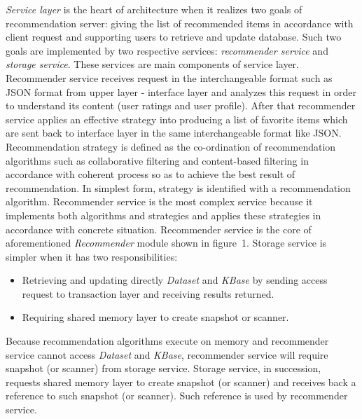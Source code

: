 \documentclass[a4paper]{llncs}
\begin{document}
\textit{Service layer} is the heart of architecture when it realizes two goals of recommendation server: giving the list of recommended items in accordance with client request and supporting users to retrieve and update database. Such two goals are implemented by two respective services: \textit{recommender service} and \textit{storage service}. These services are main components of service layer. Recommender service receives request in the interchangeable format such as JSON format from upper layer - interface layer and analyzes this request in order to understand its content (user ratings and user profile). After that recommender service applies an effective strategy into producing a list of favorite items which are sent back to interface layer in the same interchangeable format like JSON. Recommendation strategy is defined as the co-ordination of recommendation algorithms such as collaborative filtering and content-based filtering in accordance with coherent process so as to achieve the best result of recommendation. In simplest form, strategy is identified with a recommendation algorithm. Recommender service is the most complex service because it implements both algorithms and strategies and applies these strategies in accordance with concrete situation. Recommender service is the core of aforementioned \textit{Recommender} module shown in figure~1. Storage service is simpler when it has two responsibilities:
\begin{itemize}
\item Retrieving and updating directly \textit{Dataset} and \textit{KBase} by sending access request to transaction layer and receiving results returned.
\item Requiring shared memory layer to create snapshot or scanner.
\end{itemize}
Because recommendation algorithms execute on memory and recommender service cannot access \textit{Dataset} and \textit{KBase}, recommender service will require snapshot (or scanner) from storage service. Storage service, in succession, requests shared memory layer to create snapshot (or scanner) and receives back a reference to such snapshot (or scanner). Such reference is used by recommender service.
\end{document}
